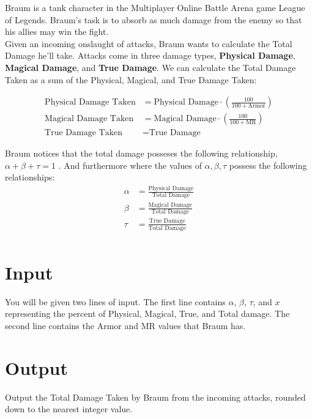 
Braum is a tank character in the Multiplayer Online Battle Arena game League of Legends. Braum’s task is to absorb as
much damage from the enemy so that his allies may win the fight. \\

Given an incoming onslaught of attacks, Braum wants to calculate the Total Damage he’ll take.
Attacks come in three damage types, \textbf{Physical Damage}, \textbf{Magical Damage}, and \textbf{True Damage}.
We can calculate the Total Damage Taken as a sum of the Physical, Magical, and True Damage Taken:

\begin{align*}
    \text{Physical Damage Taken} &= \text{Physical Damage} \cdot \left( \frac{100}{100 + \text{Armor}}\right) \\
    \text{Magical Damage Taken} &= \text{Magical Damage} \cdot \left( \frac{100}{100 + \text{MR}}\right) \\
    \text{True Damage Taken} &= \text{True Damage}
\end{align*}

Braum notices that the total damage posseses the following relationship, $\alpha + \beta + \tau = 1$ . And furthermore
where the values of $\alpha, \beta, \tau$ possess the following relationships:
\begin{align*}
    \alpha &= \frac{\text{Physical Damage}}{\text{Total Damage}} \\
    \beta &= \frac{\text{Magical Damage}}{\text{Total Damage}} \\
    \tau  &= \frac{\text{True Damage}}{\text{Total Damage}}\\
\end{align*}

\section*{Input}
You will be given two lines of input. The first line contains $\alpha$, $\beta$, $\tau$, and $x$ representing the
percent of Physical, Magical, True, and Total damage. The second line contains the Armor and MR values that Braum has.

\section*{Output}
Output the Total Damage Taken by Braum from the incoming attacks, rounded down to the nearest integer value.
